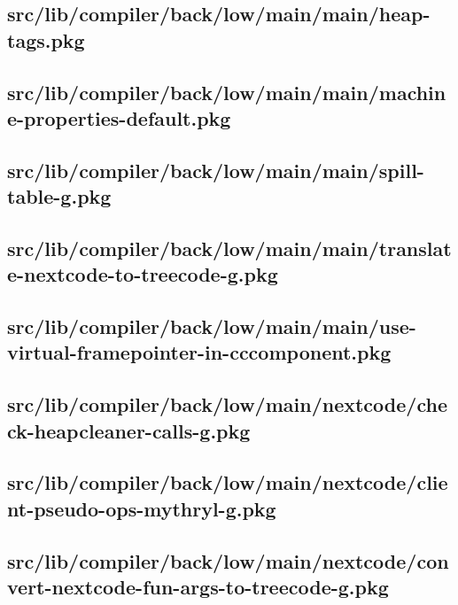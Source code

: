 \subsection{src/lib/compiler/back/low/main/main/heap-tags.pkg}


\subsection{src/lib/compiler/back/low/main/main/machine-properties-default.pkg}


\subsection{src/lib/compiler/back/low/main/main/spill-table-g.pkg}


\subsection{src/lib/compiler/back/low/main/main/translate-nextcode-to-treecode-g.pkg}


\subsection{src/lib/compiler/back/low/main/main/use-virtual-framepointer-in-cccomponent.pkg}


\subsection{src/lib/compiler/back/low/main/nextcode/check-heapcleaner-calls-g.pkg}


\subsection{src/lib/compiler/back/low/main/nextcode/client-pseudo-ops-mythryl-g.pkg}


\subsection{src/lib/compiler/back/low/main/nextcode/convert-nextcode-fun-args-to-treecode-g.pkg}


